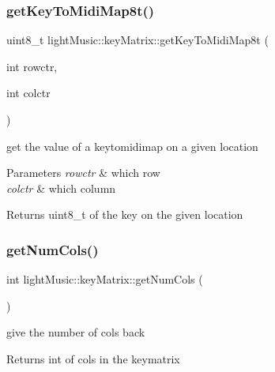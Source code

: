 \subsubsection{\texorpdfstring{get\+Key\+To\+Midi\+Map8t()}{getKeyToMidiMap8t()}}
{\footnotesize\ttfamily uint8\+\_\+t light\+Music\+::key\+Matrix\+::get\+Key\+To\+Midi\+Map8t (\begin{DoxyParamCaption}\item[{int}]{rowctr,  }\item[{int}]{colctr }\end{DoxyParamCaption})}



get the value of a keytomidimap on a given location 


\begin{DoxyParams}{Parameters}
{\em rowctr} & which row \\
\hline
{\em colctr} & which column \\
\hline
\end{DoxyParams}
\begin{DoxyReturn}{Returns}
uint8\+\_\+t of the key on the given location 
\end{DoxyReturn}
\mbox{\label{classlight_music_1_1key_matrix_a26d5321912cf6eb7e4cb653ae52f2127}} 
\subsubsection{\texorpdfstring{get\+Num\+Cols()}{getNumCols()}}
{\footnotesize\ttfamily int light\+Music\+::key\+Matrix\+::get\+Num\+Cols (\begin{DoxyParamCaption}{ }\end{DoxyParamCaption})}



give the number of cols back 

\begin{DoxyReturn}{Returns}
int of cols in the keymatrix 
\end{DoxyReturn}
\mbox{\label{classlight_music_1_1key_matrix_ac57a81f084a6eed8aea1db203ddebcbe}} 

